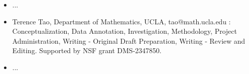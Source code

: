 \begin{itemize}
    \item ...
    \item Terence Tao, Department of Mathematics, UCLA, tao@math.ucla.edu : Conceptualization, Data Annotation, Investigation, Methodology, Project Administration, Writing - Original Draft Preparation, Writing - Review and Editing. Supported by NSF grant DMS-2347850.
    \item ...
\end{itemize}
